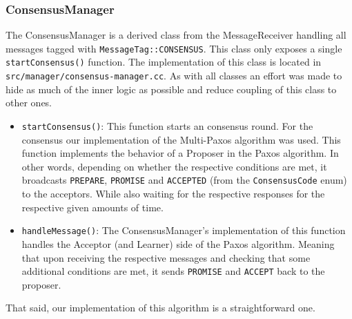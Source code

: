 \documentclass[11pt]{article}
\begin{document}
\subsubsection{ConsensusManager}
The ConsensusManager is a derived class from the MessageReceiver handling all
messages tagged with \texttt{MessageTag::CONSENSUS}. This class only exposes a
single \texttt{startConsensus()} function. The implementation of this class is
located in \texttt{src/manager/consensus-manager.cc}. As with all classes an
effort was made to hide as much of the inner logic as possible and reduce
coupling of this class to other ones.\\
\begin{itemize}
\item \texttt{startConsensus()}: This function starts an consensus round. For the
consensus our implementation of the Multi-Paxos algorithm was used. This
function implements the behavior of a Proposer in the Paxos algorithm. In other
words, depending on whether the respective conditions are met, it broadcasts
\texttt{PREPARE}, \texttt{PROMISE} and \texttt{ACCEPTED} (from the
\texttt{ConsensusCode} enum) to the acceptors.  While also waiting for the
respective responses for the respective given amounts of time.\\
\item \texttt{handleMessage()}: The ConsensusManager's implementation of this
  function handles the Acceptor (and Learner) side of the Paxos
  algorithm. Meaning that upon receiving the respective messages and checking
  that some additional conditions are met, it sends \texttt{PROMISE} and
  \texttt{ACCEPT} back to the proposer.\\
\end{itemize}
That said, our implementation of this algorithm is a straightforward one.
\end{document}
